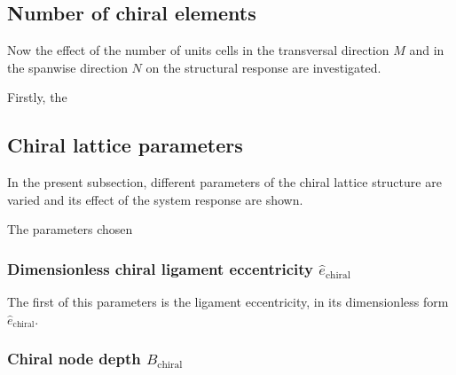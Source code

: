 
\subsection{Number of chiral elements} \label{subsec:MandN_para}

  Now the effect of the number of units cells in the transversal direction $M$ and in the spanwise direction $N$ on the structural response are investigated.

  Firstly, the

\subsection{Chiral lattice parameters} \label{subsec:chiral_para}

  In the present subsection, different parameters of the chiral lattice structure are varied and its effect of the system response are shown. 

  The parameters chosen 

  \subsubsection{Dimensionless chiral ligament eccentricity $\hat{e}_{\mathrm{chiral}}$}

    The first of this parameters is the ligament eccentricity, in its dimensionless form $\hat{e}_{\mathrm{chiral}}$.

  \subsubsection{Chiral node depth $B_{\mathrm{chiral}}$}

